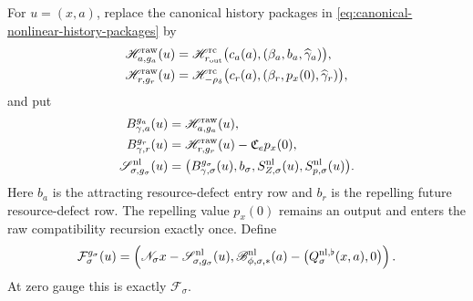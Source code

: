 \begin{theorem}
For \(u=(x,a)\), replace the canonical history packages in
\cref{eq:canonical-nonlinear-history-packages} by
\begin{align}
 \mathscr H_{a,g_a}^{\rm raw}(u)
 &=\mathscr H_{r_{\rm out}}^{\rm rc}
      \bigl(c_a(a),(\beta_a,b_a,\widehat\gamma_a)\bigr),
                                                        \notag\\
 \mathscr H_{r,g_r}^{\rm raw}(u)
 &=\mathscr H_{-\rho_\delta}^{\rm rc}
      \bigl(c_r(a),(\beta_r,p_x(0),\widehat\gamma_r)\bigr),
                                                        \label{eq:raw-gauge-history-packages}
\end{align}
and put
\begin{align}
 B_{\gamma,a}^{g_a}(u)
 &=\mathscr H_{a,g_a}^{\rm raw}(u),\notag\\
 B_{\gamma,r}^{g_r}(u)
 &=\mathscr H_{r,g_r}^{\rm raw}(u)-\mathfrak C_ep_x(0),
                                                        \label{eq:raw-gauge-history-rows}\\
 \mathscr S_{\sigma,g_\sigma}^{\rm nl}(u)
 &=\bigl(B_{\gamma,\sigma}^{g_\sigma}(u),b_\sigma,
          S_{Z,\sigma}^{\rm nl}(u),
          S_{p,\sigma}^{\rm nl}(u)\bigr).       \label{eq:raw-gauge-normal-package}
\end{align}
Here \(b_a\) is the attracting resource-defect entry row and \(b_r\) is
the repelling future resource-defect row.  The repelling value \(p_x(0)\)
remains an output and enters the raw compatibility recursion exactly once.
Define
\begin{equation}
 \mathcal F_{\sigma}^{g_\sigma}(u)
 =\left(
   \mathscr N_\sigma x-
       \mathscr S_{\sigma,g_\sigma}^{\rm nl}(u),
   \mathscr B_{\phi,\sigma,*}^{\rm nl}(a)
       -\bigl(Q_\sigma^{\rm nl,\flat}(x,a),0\bigr)
       \right).                                  \label{eq:raw-gauge-residual}
\end{equation}
At zero gauge this is exactly \(\mathcal F_\sigma\).


\end{theorem}

